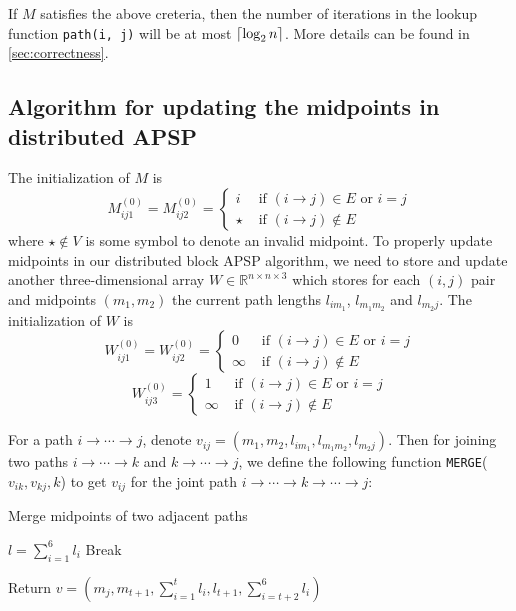 \documentclass{article} %
\DeclarePairedDelimiter\ceil{\lceil}{\rceil}
\newcommand{\real}{\mathbb{R}}
\begin{document}
If $M$ satisfies the above creteria, then the number of iterations in the lookup function {\tt path(i, j)} will be at most $\ceil{\log_2 n}$. More details can be found in \ref{sec:correctness}.

\subsection{Algorithm for updating the midpoints in distributed APSP}
The initialization of $M$ is 
\[
M_{ij1}^{(0)} = M_{ij2}^{(0)} = 
\begin{cases}
i &\text{ if } (i \to j) \in E \text{ or } i = j\\
\star &\text{ if } (i \to j) \notin E
\end{cases}
\]
where $\star \notin V$ is some symbol to denote an invalid midpoint.
To properly update midpoints in our distributed block APSP algorithm, we need to store and update another three-dimensional array $W \in \real^{n \times n \times 3}$ which stores for each $(i, j)$ pair and midpoints $(m_1, m_2)$ the current path lengths $l_{im_1}$, $l_{m_1m_2}$ and $l_{m_2j}$. The initialization of $W$ is
\[
W_{ij1}^{(0)} = W_{ij2}^{(0)} = 
\begin{cases}
0 &\text{ if } (i \to j) \in E \text{ or } i = j\\
\infty &\text{ if } (i \to j) \notin E
\end{cases}
\]
\[
W_{ij3}^{(0)} = 
\begin{cases}
1 &\text{ if } (i \to j) \in E \text{ or } i = j\\
\infty &\text{ if } (i \to j) \notin E
\end{cases}
\]

For a path $i \to \cdots \to j$, denote $v_{ij} = (m_1, m_2, l_{im_1}, l_{m_1m_2}, l_{m_2j})$. Then for joining two paths $i \to \cdots \to k$ and $k \to \cdots \to j$, we define the following function {\tt MERGE}($v_{ik}, v_{kj}, k$) to get $v_{ij}$ for the joint path $i \to \cdots \to k \to \cdots \to j$:

\begin{algorithm}[H]
\caption{Merge midpoints of two adjacent paths}
\begin{algorithmic}
 \State $l = \sum_{i = 1}^6 l_i$
	  \State Break
	\EndIf
 \EndFor

  Return $v = (m_j, m_{t+1}, \sum_{i = 1}^t l_i, l_{t + 1}, \sum_{i = t + 2}^6 l_i)$
\EndFunction
\end{algorithmic}
\end{algorithm}
\end{document}
